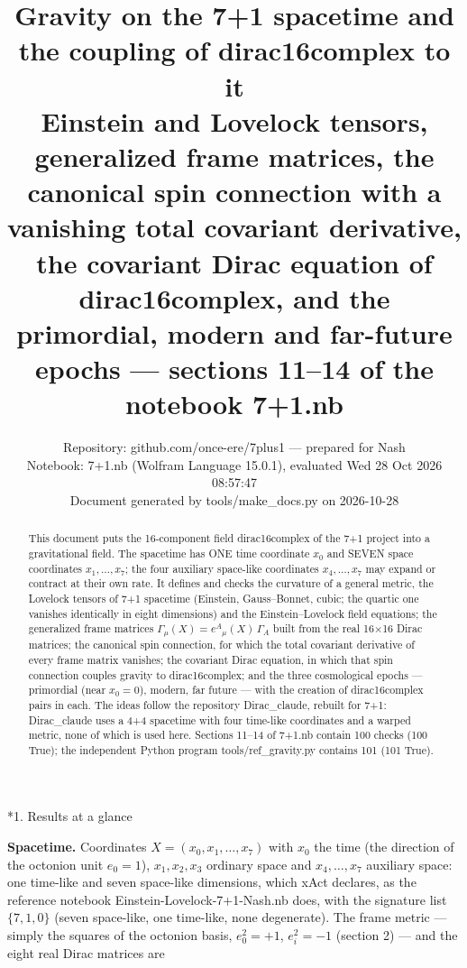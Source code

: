 \documentclass[10pt,a4paper]{article}
\makeatletter
\renewcommand\section{\@startsection{section}{1}{\z@}{-3.5ex \@plus -1ex \@minus -.2ex}{2.3ex \@plus.2ex}{\normalfont\Large\bfseries\raggedright}}
\makeatother
\begin{document}
\title{Gravity on the 7+1 spacetime and the coupling of dirac16complex to it\\[0.4em]\large Einstein and Lovelock tensors, generalized frame matrices, the canonical spin connection with a vanishing total covariant derivative, the covariant Dirac equation of dirac16complex, and the primordial, modern and far-future epochs — sections 11–14 of the notebook 7+1.nb}
\author{Repository: github.com/once-ere/7plus1 — prepared for Nash\\ Notebook: 7+1.nb (Wolfram Language 15.0.1), evaluated Wed 28 Oct 2026 08:57:47\\ Document generated by tools/make\_docs.py on 2026-10-28}
\date{}
\maketitle
\begin{abstract}
This document puts the 16-component field dirac16complex of the 7+1 project into a gravitational field. The spacetime has ONE time coordinate $x_0$ and SEVEN space coordinates $x_1,\dots,x_7$; the four auxiliary space-like coordinates $x_4,\dots,x_7$ may expand or contract at their own rate. It defines and checks the curvature of a general metric, the Lovelock tensors of 7+1 spacetime (Einstein, Gauss–Bonnet, cubic; the quartic one vanishes identically in eight dimensions) and the Einstein–Lovelock field equations; the generalized frame matrices $\Gamma_\mu(X)=e^A{}_\mu(X)\,\Gamma_A$ built from the real 16×16 Dirac matrices; the canonical spin connection, for which the total covariant derivative of every frame matrix vanishes; the covariant Dirac equation, in which that spin connection couples gravity to dirac16complex; and the three cosmological epochs — primordial (near $x_0=0$), modern, far future — with the creation of dirac16complex pairs in each. The ideas follow the repository Dirac\_claude, rebuilt for 7+1: Dirac\_claude uses a 4+4 spacetime with four time-like coordinates and a warped metric, none of which is used here. Sections 11–14 of 7+1.nb contain 100 checks (100 True); the independent Python program tools/ref\_gravity.py contains 101 (101 True).
\end{abstract}
\tableofcontents
{}\section*{1. Results at a glance}
\textbf{Spacetime.} Coordinates $X=(x_0,x_1,\dots,x_7)$ with $x_0$ the time (the direction of the octonion unit $e_0=1$), $x_1,x_2,x_3$ ordinary space and $x_4,\dots,x_7$ auxiliary space: one time-like and seven space-like dimensions, which xAct declares, as the reference notebook Einstein-Lovelock-7+1-Nash.nb does, with the signature list $\{7,1,0\}$ (seven space-like, one time-like, none degenerate). The frame metric — simply the squares of the octonion basis, $e_0^2=+1$, $e_i^2=-1$ (section 2) — and the eight real Dirac matrices are
\end{document}
